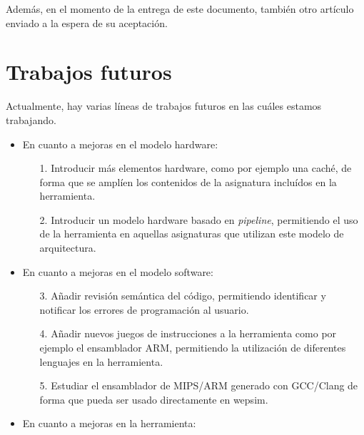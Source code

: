 Además, en el momento de la entrega de este documento, también otro artículo enviado a la espera de su aceptación.

\vspace{1cm}

\section{Trabajos futuros}

Actualmente, hay varias líneas de trabajos futuros en las cuáles estamos trabajando.

\begin{itemize}

\item En cuanto a mejoras en el modelo \gls{hardware}:

\begin{itemize}

\item[1.] Introducir más elementos \gls{hardware}, como por ejemplo una caché, de forma que se amplíen los contenidos de la asignatura incluídos en la herramienta.

\item[2.] Introducir un modelo \gls{hardware} basado en \textit{pipeline}, permitiendo el uso de la herramienta en aquellas asignaturas que utilizan este modelo de arquitectura. 

\end{itemize}

\item En cuanto a mejoras en el modelo \gls{software}:

\begin{itemize}

\item[3.] Añadir revisión semántica del código, permitiendo identificar y notificar los errores de programación al usuario.

\item[4.] Añadir nuevos juegos de instrucciones a la herramienta como por ejemplo el \gls{ensamblador} ARM, permitiendo la utilización de diferentes lenguajes en la herramienta.

\item[5.] Estudiar el \gls{ensamblador} de MIPS/ARM generado con GCC/Clang de forma que pueda ser usado directamente en \acrshort{wepsim}.

\end{itemize}

\item En cuanto a mejoras en la herramienta:


\end{itemize}
